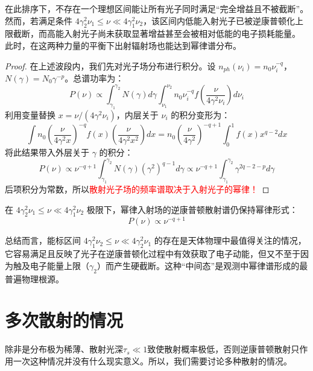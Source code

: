 在此排序下，不存在一个理想区间能让所有光子同时满足“完全增益且不被截断”。然而，若满足条件 $4\gamma_2^2\nu_1 \leq \nu \ll 4\gamma_1^2\nu_2$，该区间内低能入射光子已被逆康普顿化上限截断，而高能入射光子尚未获取显著增益甚至会被相对低能的电子损耗能量。
此时，在这两种力量的平衡下出射辐射场也能达到幂律谱分布。

\begin{proof}
在上述波段内，我们先对光子场分布进行积分。设 $n_{ph}(\nu_i) = n_0 \nu_i^{-q}$，$N(\gamma) = N_0 \gamma^{-p}$。总谱功率为：
\begin{equation}
    P(\nu) \propto \int_{\gamma_1}^{\gamma_2} N(\gamma) d\gamma \int_{\nu_1}^{\nu_2} n_0 \nu_i^{-q} f\left(\frac{\nu}{4\gamma^2 \nu_i}\right) d\nu_i
\end{equation}
利用变量替换 $x = \nu / (4\gamma^2 \nu_i)$，内层关于 $\nu_i$ 的积分变形为：
\begin{equation}
    \int n_0 \left( \frac{\nu}{4\gamma^2 x} \right)^{-q} f(x) \left( \frac{\nu}{4\gamma^2 x^2} \right) dx = n_0 \left( \frac{\nu}{4\gamma^2} \right)^{-q+1} \int_0^1 f(x) x^{q-2} dx
\end{equation}
将此结果带入外层关于 $\gamma$ 的积分：
\begin{equation}
    P(\nu) \propto \nu^{-q+1} \int_{\gamma_1}^{\gamma_2} N(\gamma) (\gamma^2)^{q-1} d\gamma \propto \nu^{-q+1} \int_{\gamma_1}^{\gamma_2} \gamma^{2q-2-p} d\gamma
\end{equation}
后项积分为常数，所以\textcolor{red}{散射光子场的频率谱取决于入射光子的幂律！}
\end{proof}

\begin{tcolorbox}[colframe=black, colback=white, boxrule=0.5pt, arc=0pt]
在 $4\gamma_2^2\nu_1 \leq \nu \ll 4\gamma_1^2\nu_2$ 极限下，幂律入射场的逆康普顿散射谱仍保持幂律形式：
\begin{equation}
    P(\nu) \propto \nu^{-q+1}
\end{equation}
\end{tcolorbox}

总结而言，能标区间 $4\gamma_1^2\nu_2 \le \nu \ll 4\gamma_2^2\nu_1$ 的存在是天体物理中最值得关注的情况，它容易满足且反映了光子在逆康普顿化过程中有效获取了电子动能，但又不至于因为触及电子能量上限（$\gamma_2$）而产生硬截断。这种“中间态”是观测中幂律谱形成的最普遍物理根源。
\section{多次散射的情况}
除非是分布极为稀薄、散射光深$\tau_s \ll 1$致使散射概率极低，否则逆康普顿散射只作用一次这种情况并没有什么现实意义。所以，我们需要讨论多种散射的情况。
